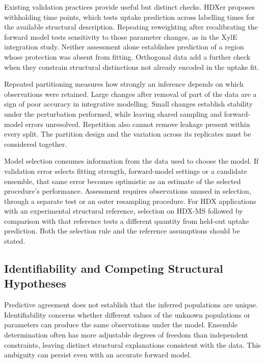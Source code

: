 Existing validation practices provide useful but distinct checks. HDXer proposes withholding time points, which tests uptake prediction across labelling times for the available structural description.\supercite{bradshawInterpretationHDXData2020} Repeating reweighting after recalibrating the forward model tests sensitivity to those parameter changes, as in the XylE integration study.\supercite{jiaIntegratingHydrogenDeuterium2023} Neither assessment alone establishes prediction of a region whose protection was absent from fitting. Orthogonal data add a further check when they constrain structural distinctions not already encoded in the uptake fit.

Repeated partitioning measures how strongly an inference depends on which observations were retained. Large changes after removal of part of the data are a sign of poor accuracy in integrative modelling.\supercite{bonomiPrinciplesProteinStructural2017} Small changes establish stability under the perturbation performed, while leaving shared sampling and forward-model errors unresolved. Repetition also cannot remove leakage present within every split. The partition design and the variation across its replicates must be considered together.

Model selection consumes information from the data used to choose the model. If validation error selects fitting strength, forward-model settings or a candidate ensemble, that same error becomes optimistic as an estimate of the selected procedure's performance.\supercite{cawleyOverfittingModelSelection2010} Assessment requires observations unused in selection, through a separate test or an outer resampling procedure. For HDX applications with an experimental structural reference, selection on HDX-MS followed by comparison with that reference tests a different quantity from held-out uptake prediction. Both the selection rule and the reference assumptions should be stated.

\subsection{Identifiability and Competing Structural Hypotheses}
\label{sec:bg-identifiability}

Predictive agreement does not establish that the inferred populations are unique. Identifiability concerns whether different values of the unknown populations or parameters can produce the same observations under the model. Ensemble determination often has more adjustable degrees of freedom than independent constraints, leaving distinct structural explanations consistent with the data.\supercite{berlinRecoveringRepresentativeConformational2013,bonomiPrinciplesProteinStructural2017} This ambiguity can persist even with an accurate forward model.

